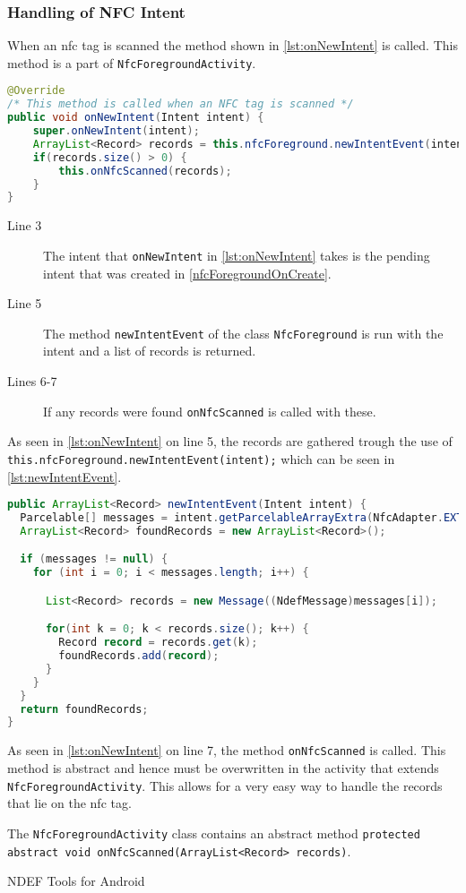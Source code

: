 \subsubsection{Handling of NFC Intent}
When an \ac{nfc} tag is scanned the method shown in \autoref{lst:onNewIntent} is called. This method is a part of \lstinline|NfcForegroundActivity|.
\begin{lstlisting}[language=java, label=lst:onNewIntent, caption=onNewIntent]
@Override
/* This method is called when an NFC tag is scanned */
public void onNewIntent(Intent intent) { 
    super.onNewIntent(intent);
    ArrayList<Record> records = this.nfcForeground.newIntentEvent(intent);
    if(records.size() > 0) {
        this.onNfcScanned(records);
    }
}  
\end{lstlisting}
\begin{description}
\item[Line 3] The intent that \lstinline|onNewIntent| in \autoref{lst:onNewIntent} takes is the pending intent that was created in \autoref{nfcForegroundOnCreate}.
\item[Line 5] The method \lstinline|newIntentEvent| of the class \lstinline|NfcForeground| is run with the intent and a list of records is returned.
\item[Lines 6-7] If any records were found \lstinline|onNfcScanned| is called with these.
\end{description}
As seen in \autoref{lst:onNewIntent} on line 5, the records are gathered trough the use of \lstinline|this.nfcForeground.newIntentEvent(intent);| which can be seen in \autoref{lst:newIntentEvent}.

\begin{lstlisting}[language=java, label=lst:newIntentEvent, caption=newIntentEvent]
public ArrayList<Record> newIntentEvent(Intent intent) {
  Parcelable[] messages = intent.getParcelableArrayExtra(NfcAdapter.EXTRA_NDEF_MESSAGES);
  ArrayList<Record> foundRecords = new ArrayList<Record>();

  if (messages != null) {
    for (int i = 0; i < messages.length; i++) {

      List<Record> records = new Message((NdefMessage)messages[i]);

      for(int k = 0; k < records.size(); k++) {
        Record record = records.get(k);
        foundRecords.add(record);
      }
    }
  }
  return foundRecords;
}
\end{lstlisting}




As seen in \autoref{lst:onNewIntent} on line 7, the method \lstinline|onNfcScanned| is called. This method is abstract and hence must be overwritten in the activity that extends \lstinline|NfcForegroundActivity|. This allows for a very easy way to handle the records that lie on the \ac{nfc} tag.

The \lstinline|NfcForegroundActivity| class contains an abstract method \lstinline|protected abstract void onNfcScanned(ArrayList<Record> records)|. 


NDEF Tools for Android \citep{ndeftools}